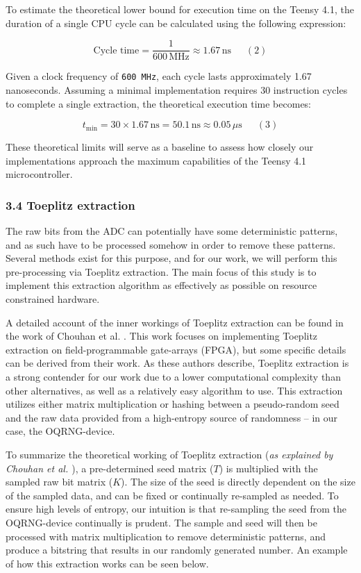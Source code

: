 \documentclass{sigchi}
\begin{document}
To estimate the theoretical lower bound for execution time on the Teensy 4.1, the duration of a single CPU cycle can be calculated using the following expression:

\[
\text{Cycle time} = \frac{1}{600\, \mathrm{MHz}} \approx 1.67\, \mathrm{ns} \phantom{123}(2)
\]

Given a clock frequency of \texttt{600\ MHz}, each cycle lasts approximately 1.67 nanoseconds. Assuming a minimal implementation requires 30 instruction cycles to complete a single extraction, the theoretical execution time becomes:

\[
t_{\text{min}} = 30 \times 1.67\,\mathrm{ns} = 50.1\,\mathrm{ns} \approx 0.05\,\mu\mathrm{s} \phantom{123}(3)
\]

These theoretical limits will serve as a baseline to assess how closely our implementations approach the maximum capabilities of the Teensy 4.1 microcontroller.

\subsubsection{3.4 Toeplitz extraction}\label{toeplitz-extraction}

The raw bits from the ADC can potentially have some deterministic patterns, and as such have to be processed somehow in order to remove these patterns. Several methods exist for this purpose, and for our work, we will perform this pre-processing via Toeplitz extraction. The main focus of this study is to implement this extraction algorithm as effectively as possible on resource constrained hardware.

A detailed account of the inner workings of Toeplitz extraction can be found in the work of Chouhan et al. \cite{toeplitz-desc}. This work focuses on implementing Toeplitz extraction on field-programmable gate-arrays (FPGA), but some specific details can be derived from their work. As these authors describe, Toeplitz extraction is a strong contender for our work due to a lower computational complexity than other alternatives, as well as a relatively easy algorithm to use. This extraction utilizes either matrix multiplication or hashing between a pseudo-random seed and the raw data provided from a high-entropy source of randomness -- in our case, the OQRNG-device.

To summarize the theoretical working of Toeplitz extraction (\emph{as explained by Chouhan et al. \cite{toeplitz-desc}}), a pre-determined seed matrix (\(T\)) is multiplied with the sampled raw bit matrix (\(K\)). The size of the seed is directly dependent on the size of the sampled data, and can be fixed or continually re-sampled as needed. To ensure high levels of entropy, our intuition is that re-sampling the seed from the OQRNG-device continually is prudent. The sample and seed will then be processed with matrix multiplication to remove deterministic patterns, and produce a bitstring that results in our randomly generated number. An example of how this extraction works can be seen below.
\end{document}
